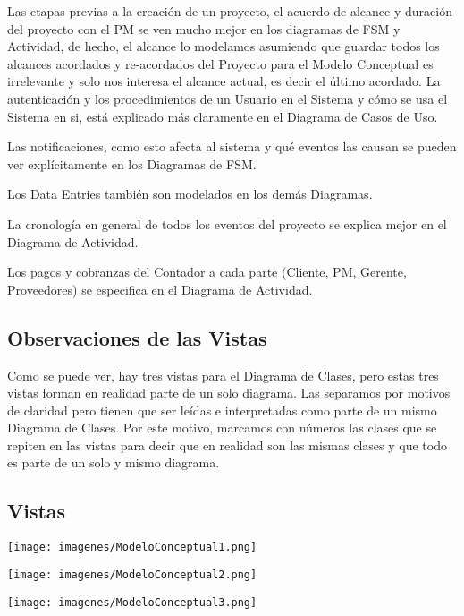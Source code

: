 Las etapas previas a la creación de un proyecto, el acuerdo de alcance y duración del proyecto con el PM se ven mucho mejor en los diagramas de FSM y Actividad, de hecho, el alcance lo modelamos asumiendo que guardar todos los alcances acordados y re-acordados del Proyecto para el Modelo Conceptual es irrelevante y solo nos interesa el alcance actual, es decir el último acordado.
La autenticación y los procedimientos de un Usuario en el Sistema y cómo se usa el Sistema en si, está explicado más claramente en el Diagrama de Casos de Uso.

Las notificaciones, como esto afecta al sistema y qué eventos las causan se pueden ver explícitamente en los Diagramas de FSM. 

Los Data Entries también son modelados en los demás Diagramas. 

La cronología en general de todos los eventos del proyecto se explica mejor en el Diagrama de Actividad.

Los pagos y cobranzas del Contador a cada parte (Cliente, PM, Gerente, Proveedores) se especifica en el Diagrama de Actividad.

\subsection{Observaciones de las Vistas}
Como se puede ver, hay tres vistas para el Diagrama de Clases, pero estas tres vistas forman en realidad parte de un solo diagrama. Las separamos por motivos de claridad pero tienen que ser leídas e interpretadas como parte de un mismo Diagrama de Clases. Por este motivo, marcamos con números las clases que se repiten en las vistas para decir que en realidad son las mismas clases y que todo es parte de un solo y mismo diagrama.

\newpage
\subsection{Vistas}
\begin{center}
\texttt{[image: imagenes/ModeloConceptual1.png]}
\end{center}
\newpage
\begin{center}
\texttt{[image: imagenes/ModeloConceptual2.png]}
\end{center}
\newpage
\begin{center}
\texttt{[image: imagenes/ModeloConceptual3.png]}
\end{center}


